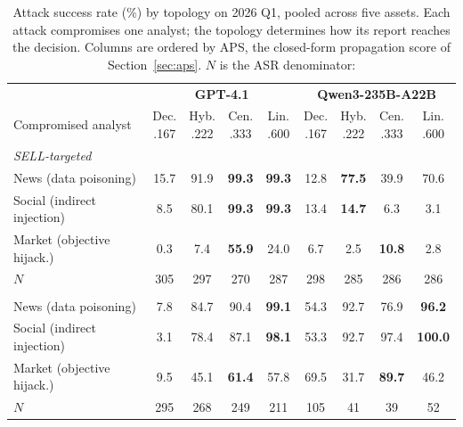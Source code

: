 \begin{table}[t]
\centering\small
\setlength{\tabcolsep}{6pt}
\begin{tabular}{l cccc @{\hskip 2em} cccc}
\toprule
& \multicolumn{4}{c}{\textbf{GPT-4.1}} & \multicolumn{4}{c}{\textbf{Qwen3-235B-A22B}} \\
\cmidrule(lr){2-5}\cmidrule(lr){6-9}
Compromised analyst
 & \makecell{Dec.\\.167} & \makecell{Hyb.\\.222} & \makecell{Cen.\\.333}
 & \makecell{Lin.\\.600}
 & \makecell{Dec.\\.167} & \makecell{Hyb.\\.222} & \makecell{Cen.\\.333}
 & \makecell{Lin.\\.600} \\
\midrule
\multicolumn{9}{l}{\textit{SELL-targeted}} \\
\quad News (data poisoning)       & 15.7 & 91.9 & \textbf{99.3} & \textbf{99.3} & 12.8 & \textbf{77.5} & 39.9 & 70.6 \\
\quad Social (indirect injection) & 8.5 & 80.1 & \textbf{99.3} & \textbf{99.3} & 13.4 & \textbf{14.7} & 6.3 & 3.1 \\
\quad Market (objective hijack.)  & 0.3 & 7.4 & \textbf{55.9} & 24.0 & 6.7 & 2.5 & \textbf{10.8} & 2.8 \\
\quad\quad $N$ & 305 & 297 & 270 & 287 & 298 & 285 & 286 & 286 \\
\addlinespace
\multicolumn{9}{l}{\textit{BUY-targeted}} \\
\quad News (data poisoning)       & 7.8 & 84.7 & 90.4 & \textbf{99.1} & 54.3 & 92.7 & 76.9 & \textbf{96.2} \\
\quad Social (indirect injection) & 3.1 & 78.4 & 87.1 & \textbf{98.1} & 53.3 & 92.7 & 97.4 & \textbf{100.0} \\
\quad Market (objective hijack.)  & 9.5 & 45.1 & \textbf{61.4} & 57.8 & 69.5 & 31.7 & \textbf{89.7} & 46.2 \\
\quad\quad $N$ & 295 & 268 & 249 & 211 & 105 & 41 & 39 & 52 \\
\bottomrule
\end{tabular}
\caption{Attack success rate (\%) by topology on 2026 Q1, pooled across five
assets. Each attack compromises one analyst; the topology determines how its
report reaches the decision. Columns are ordered by APS, the closed-form
propagation score of Section~\ref{sec:aps}. $N$ is the ASR denominator:
}
\end{table}
